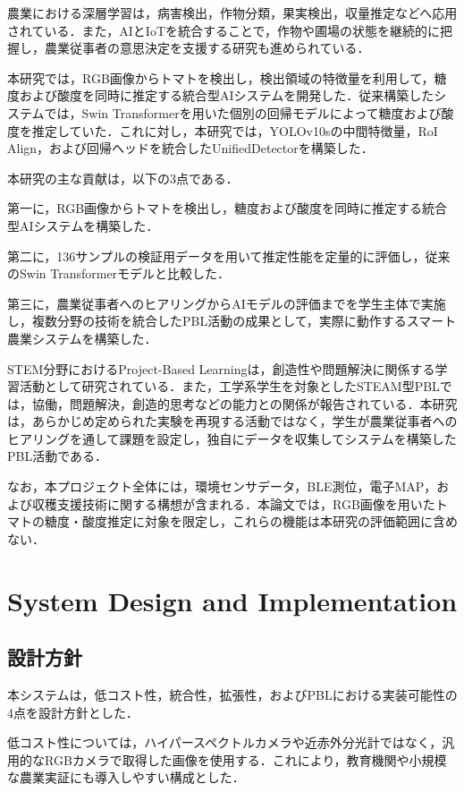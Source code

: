 \documentclass[authorproof,JRM,paper]{fujipressarticle}
\begin{document}
農業における深層学習は，病害検出，作物分類，果実検出，収量推定などへ応用されている\cite{kamilaris2018deep}．また，AIとIoTを統合することで，作物や圃場の状態を継続的に把握し，農業従事者の意思決定を支援する研究も進められている\cite{sharma2024integrating}．

本研究では，RGB画像からトマトを検出し，検出領域の特徴量を利用して，糖度および酸度を同時に推定する統合型AIシステムを開発した．従来構築したシステムでは，Swin Transformerを用いた個別の回帰モデルによって糖度および酸度を推定していた．これに対し，本研究では，YOLOv10sの中間特徴量，RoI Align，および回帰ヘッドを統合したUnifiedDetectorを構築した．

本研究の主な貢献は，以下の3点である．

第一に，RGB画像からトマトを検出し，糖度および酸度を同時に推定する統合型AIシステムを構築した．

第二に，136サンプルの検証用データを用いて推定性能を定量的に評価し，従来のSwin Transformerモデルと比較した．

第三に，農業従事者へのヒアリングからAIモデルの評価までを学生主体で実施し，複数分野の技術を統合したPBL活動の成果として，実際に動作するスマート農業システムを構築した．

STEM分野におけるProject-Based Learningは，創造性や問題解決に関係する学習活動として研究されている\cite{kwon2025meta}．また，工学系学生を対象としたSTEAM型PBLでは，協働，問題解決，創造的思考などの能力との関係が報告されている\cite{oanh2025effect}．本研究は，あらかじめ定められた実験を再現する活動ではなく，学生が農業従事者へのヒアリングを通して課題を設定し，独自にデータを収集してシステムを構築したPBL活動である．

なお，本プロジェクト全体には，環境センサデータ，BLE測位，電子MAP，および収穫支援技術に関する構想が含まれる．本論文では，RGB画像を用いたトマトの糖度・酸度推定に対象を限定し，これらの機能は本研究の評価範囲に含めない．

\section{System Design and Implementation}
\subsection{設計方針}
本システムは，低コスト性，統合性，拡張性，およびPBLにおける実装可能性の4点を設計方針とした．

低コスト性については，ハイパースペクトルカメラや近赤外分光計ではなく，汎用的なRGBカメラで取得した画像を使用する．これにより，教育機関や小規模な農業実証にも導入しやすい構成とした．
\end{document}
